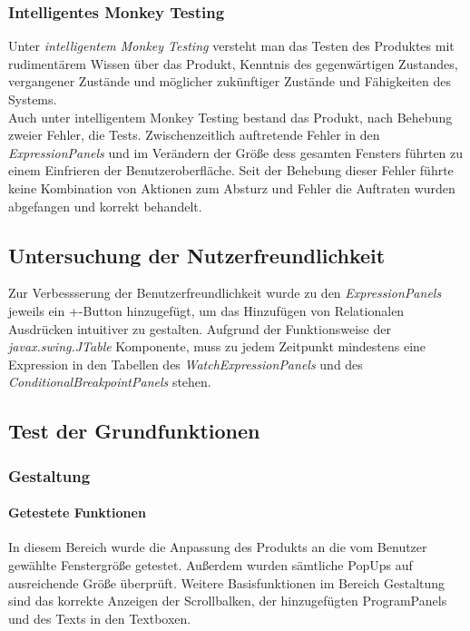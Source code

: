 \documentclass[parskip=full]{scrartcl}
\begin{document}
\subsubsection{Intelligentes Monkey Testing}
Unter \textit{intelligentem Monkey Testing} versteht man das Testen des Produktes mit rudimentärem Wissen über das Produkt, Kenntnis des gegenwärtigen Zustandes, vergangener Zustände und  möglicher zukünftiger Zustände und Fähigkeiten des Systems. \\
Auch unter intelligentem Monkey Testing bestand das Produkt, nach Behebung zweier Fehler, die Tests. Zwischenzeitlich auftretende Fehler in den \textit{ExpressionPanels} und im Verändern der Größe dess gesamten Fensters führten zu einem Einfrieren der Benutzeroberfläche. Seit der Behebung dieser Fehler führte keine Kombination von Aktionen zum Absturz und Fehler die Auftraten wurden abgefangen und korrekt behandelt.

\subsection{Untersuchung der Nutzerfreundlichkeit}
Zur Verbessserung der Benutzerfreundlichkeit wurde zu den \textit{ExpressionPanels} jeweils ein +-Button hinzugefügt, um das Hinzufügen von Relationalen Ausdrücken intuitiver zu gestalten. Aufgrund der Funktionsweise der \textit{javax.swing.JTable} Komponente, muss zu jedem Zeitpunkt mindestens eine Expression in den Tabellen des \textit{WatchExpressionPanels} und des \textit{ConditionalBreakpointPanels} stehen.

\subsection{Test der Grundfunktionen}
\subsubsection{Gestaltung}
\paragraph{Getestete Funktionen}
In diesem Bereich wurde die Anpassung des Produkts an die vom Benutzer gewählte Fenstergröße getestet. Außerdem wurden sämtliche PopUps auf ausreichende Größe überprüft.
Weitere Basisfunktionen im Bereich Gestaltung sind das korrekte Anzeigen der Scrollbalken, der hinzugefügten ProgramPanels und des Texts in den Textboxen.
\end{document}

